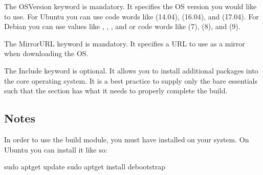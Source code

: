\documentclass[letterpaper,10pt,english]{sphinxmanual}
\begin{document}
The OSVersion keyword is mandatory. It specifies the OS version you would like to use. For Ubuntu you can use code words like  (14.04),  (16.04),
and  (17.04). For Debian you can use values like , , , and  or code words like  (7),  (8), and  (9).
\begin{quote}

%
\begin{sphinxVerbatim}[commandchars=\\\{\}]
  
\end{sphinxVerbatim}
\end{quote}

The MirrorURL keyword is mandatory. It specifies a URL to use as a mirror when downloading the OS.

%
\begin{sphinxVerbatim}[commandchars=\\\{\}]
 
\end{sphinxVerbatim}

The Include keyword is optional. It allows you to install additional packages into the core operating system. It is a best practice to supply only the bare essentials
such that the  section has what it needs to properly complete the build.


\subsection{Notes}
\label{\detokenize{appendix:id13}}
In order to use the  build module, you must have  installed on your system. On Ubuntu you can install it like so:

%
\begin{sphinxVerbatim}[commandchars=\\\{\}]
\PYGZdl{} sudo apt\PYGZhy{}get update \PYGZam{}\PYGZam{} sudo apt\PYGZhy{}get install debootstrap
\end{sphinxVerbatim}
\end{document}
